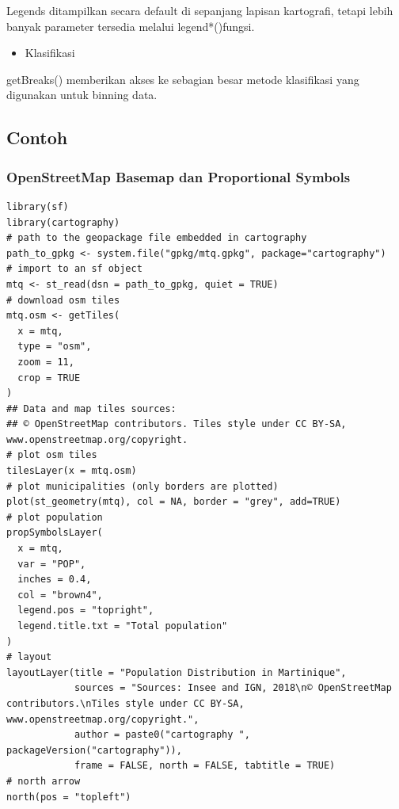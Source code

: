 \documentclass[]{book}
\providecommand{\tightlist}{%
  \setlength{\itemsep}{0pt}\setlength{\parskip}{0pt}}
\begin{document}
Legends ditampilkan secara default di sepanjang lapisan kartografi, tetapi lebih banyak parameter tersedia melalui legend*()fungsi.

\begin{itemize}
\tightlist
\item
  Klasifikasi
\end{itemize}

getBreaks() memberikan akses ke sebagian besar metode klasifikasi yang digunakan untuk binning data.

\hypertarget{contoh}{%
\subsection{Contoh}\label{contoh}}

\hypertarget{openstreetmap-basemap-dan-proportional-symbols}{%
\subsubsection{OpenStreetMap Basemap dan Proportional Symbols}\label{openstreetmap-basemap-dan-proportional-symbols}}

\begin{verbatim}
library(sf)
library(cartography)
# path to the geopackage file embedded in cartography
path_to_gpkg <- system.file("gpkg/mtq.gpkg", package="cartography")
# import to an sf object
mtq <- st_read(dsn = path_to_gpkg, quiet = TRUE)
# download osm tiles
mtq.osm <- getTiles(
  x = mtq, 
  type = "osm", 
  zoom = 11, 
  crop = TRUE
)
## Data and map tiles sources:
## © OpenStreetMap contributors. Tiles style under CC BY-SA, www.openstreetmap.org/copyright.
# plot osm tiles
tilesLayer(x = mtq.osm)
# plot municipalities (only borders are plotted)
plot(st_geometry(mtq), col = NA, border = "grey", add=TRUE)
# plot population
propSymbolsLayer(
  x = mtq, 
  var = "POP", 
  inches = 0.4, 
  col = "brown4",
  legend.pos = "topright",  
  legend.title.txt = "Total population"
)
# layout
layoutLayer(title = "Population Distribution in Martinique",
            sources = "Sources: Insee and IGN, 2018\n© OpenStreetMap contributors.\nTiles style under CC BY-SA, www.openstreetmap.org/copyright.",
            author = paste0("cartography ", packageVersion("cartography")),
            frame = FALSE, north = FALSE, tabtitle = TRUE)
# north arrow
north(pos = "topleft")
\end{verbatim}
\end{document}
